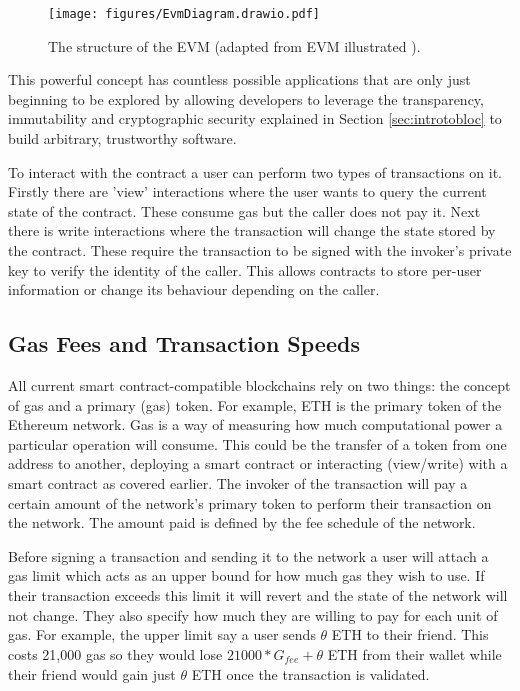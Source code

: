 \documentclass[10pt,journal,compsoc]{IEEEtran}
\begin{document}
\begin{figure}[!h]
    \centering
    \texttt{[image: figures/EvmDiagram.drawio.pdf]}
    \caption{The structure of the EVM (adapted from EVM illustrated \cite{tani_2018}).}
    \label{fig:evmdiagram}
\end{figure}

This powerful concept has countless possible applications that are only just beginning to be explored by allowing developers to leverage the transparency, immutability and cryptographic security explained in Section \ref{sec:introtobloc} to build arbitrary, trustworthy software.

To interact with the contract a user can perform two types of transactions on it. Firstly there are 'view' interactions where the user wants to query the current state of the contract. These consume gas but the caller does not pay it. Next there is write interactions where the transaction will change the state stored by the contract. These require the transaction to be signed with the invoker's private key to verify the identity of the caller. This allows contracts to store per-user information or change its behaviour depending on the caller.

\subsection{Gas Fees and Transaction Speeds}
All current smart contract-compatible blockchains rely on two things: the concept of gas and a primary (gas) token. For example, ETH is the primary token of the Ethereum network. Gas is a way of measuring how much computational power a particular operation will consume. This could be the transfer of a token from one address to another, deploying a smart contract or interacting (view/write) with a smart contract as covered earlier. The invoker of the transaction will pay a certain amount of the network's primary token to perform their transaction on the network. The amount paid is defined by the fee schedule of the network.

Before signing a transaction and sending it to the network a user will attach a gas limit which acts as an upper bound for how much gas they wish to use. If their transaction exceeds this limit it will revert and the state of the network will not change. They also specify how much they are willing to pay for each unit of gas. For example, the upper limit say a user sends $\theta$ ETH to their friend. This costs 21,000 gas so they would lose $21000 * G_{\textit{fee}} + \theta$ ETH from their wallet while their friend would gain just $\theta$ ETH once the transaction is validated. 
\end{document}
